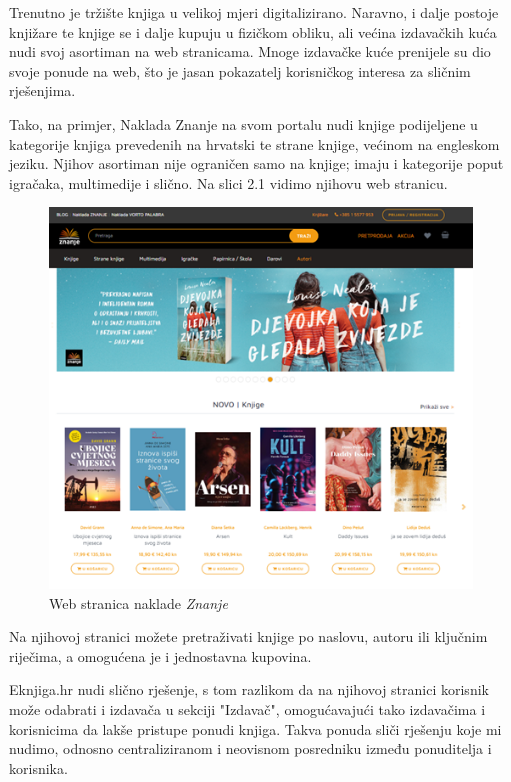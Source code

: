 		Trenutno je tržište knjiga u velikoj mjeri digitalizirano. Naravno, i dalje postoje knjižare te knjige se i dalje kupuju u fizičkom obliku, ali većina izdavačkih kuća nudi svoj asortiman na web stranicama. Mnoge izdavačke kuće prenijele su dio svoje ponude na web, što je jasan pokazatelj korisničkog interesa za sličnim rješenjima.
		
		Tako, na primjer, Naklada Znanje na svom portalu nudi knjige podijeljene u kategorije knjiga prevedenih na hrvatski te strane knjige, većinom na engleskom jeziku. Njihov asortiman nije ograničen samo na knjige; imaju i kategorije poput igračaka, multimedije i slično. Na slici 2.1 vidimo njihovu web stranicu.
		
			\begin{figure}[H]
				\includegraphics[scale=1]{slike/naklada-znanje.PNG} %
				\centering
				\caption{Web stranica naklade \textit{Znanje}}
				\label{fig:Naklada Znanje}
			\end{figure}
		
		Na njihovoj stranici možete pretraživati knjige po naslovu, autoru ili ključnim riječima, a omogućena je i jednostavna kupovina.
		
		Eknjiga.hr nudi slično rješenje, s tom razlikom da na njihovoj stranici korisnik može odabrati i izdavača u sekciji "Izdavač", omogućavajući tako izdavačima i korisnicima da lakše pristupe ponudi knjiga. Takva ponuda sliči rješenju koje mi nudimo, odnosno centraliziranom i neovisnom posredniku između ponuditelja i korisnika.
		
